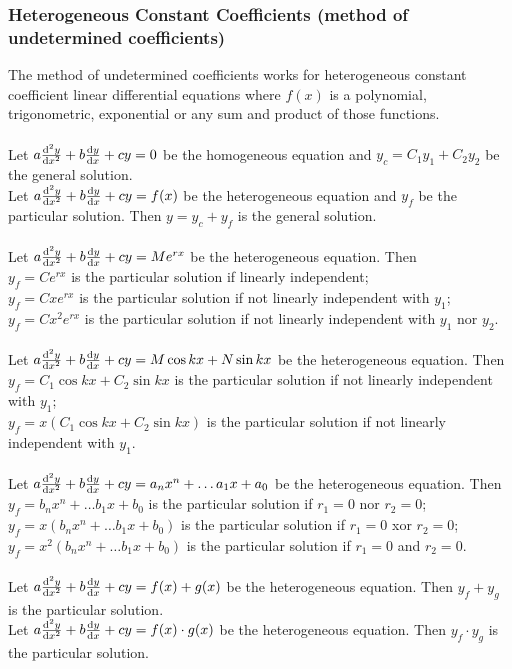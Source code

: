 \documentclass{article}
\begin{document}
			\subsubsection{Heterogeneous Constant Coefficients (method of undetermined coefficients)}
				The method of undetermined coefficients works for heterogeneous constant coefficient linear differential equations where $f(x)$ is a polynomial, trigonometric, exponential or any sum and product of those functions. \\
				\\
				Let $a\dv[2]{y}{x} + b\dv{y}{x} + cy = 0$ be the homogeneous equation and $y_c = C_1y_1 + C_2y_2$ be the general solution. \\
				Let $a\dv[2]{y}{x} + b\dv{y}{x} + cy = f(x)$ be the heterogeneous equation and $y_f$ be the particular solution. Then $y = y_c + y_f$ is the general solution. \\
				\\
				Let $a\dv[2]{y}{x} + b\dv{y}{x} + cy = Me^{rx}$ be the heterogeneous equation. Then \\
				\textbullet \; $y_f = Ce^{rx}$ is the particular solution if linearly independent; \\
				\textbullet \; $y_f = Cxe^{rx}$ is the particular solution if not linearly independent with $y_1$; \\
				\textbullet \; $y_f = Cx^{2}e^{rx}$ is the particular solution if not linearly independent with $y_1$ nor $y_2$. \\
				\\
				Let $a\dv[2]{y}{x} + b\dv{y}{x} + cy = M\cos{kx} + N\sin{kx}$ be the heterogeneous equation. Then \\
				\textbullet \; $y_f = C_1\cos{kx} + C_2\sin{kx}$ is the particular solution if not linearly independent with $y_1$; \\
				\textbullet \; $y_f = x(C_1\cos{kx} + C_2\sin{kx})$ is the particular solution if not linearly independent with $y_1$. \\
				\\
				Let $a\dv[2]{y}{x} + b\dv{y}{x} + cy = a_{n}x^{n} + \ldots a_{1}x + a_{0}$ be the heterogeneous equation. Then \\
				\textbullet \; $y_f = b_{n}x^{n} + \ldots b_{1}x + b_{0}$ is the particular solution if $r_1 = 0$ nor $r_2 = 0$; \\
				\textbullet \; $y_f = x(b_{n}x^{n} + \ldots b_{1}x + b_{0})$ is the particular solution if $r_1 = 0$ xor $r_2 = 0$; \\
				\textbullet \; $y_f = x^{2}(b_{n}x^{n} + \ldots b_{1}x + b_{0})$ is the particular solution if $r_1 = 0$ and $r_2 = 0$. \\
				\\
				Let $a\dv[2]{y}{x} + b\dv{y}{x} + cy = f(x) + g(x)$ be the heterogeneous equation. Then $y_{f} + y_{g}$ is the particular solution. \\
				Let $a\dv[2]{y}{x} + b\dv{y}{x} + cy = f(x) \cdot g(x)$ be the heterogeneous equation. Then $y_{f} \cdot y_{g}$ is the particular solution. \\
				
\end{document}
